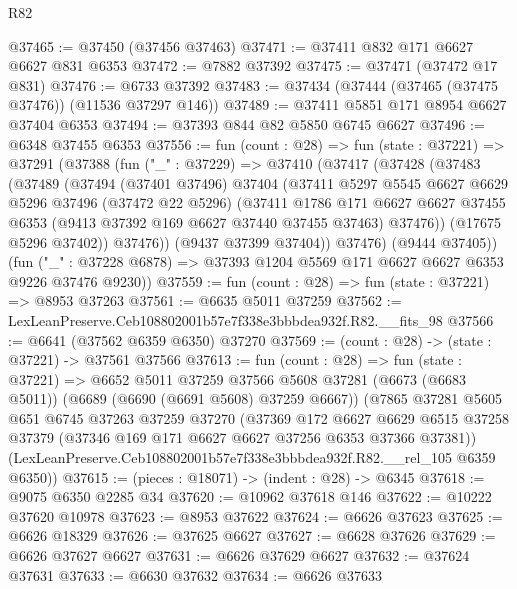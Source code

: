\begin{lexlean}{R82}
\begin{coremodule}
@37465 := @37450 (@37456 @37463)
@37471 := @37411 @832 @171 @6627 @6627 @831 @6353
@37472 := @7882 @37392
@37475 := @37471 (@37472 @17 @831)
@37476 := @6733 @37392
@37483 := @37434 (@37444 (@37465 (@37475 @37476)) (@11536 @37297 @146))
@37489 := @37411 @5851 @171 @8954 @6627 @37404 @6353
@37494 := @37393 @844 @82 @5850 @6745 @6627
@37496 := @6348 @37455 @6353
@37556 := fun (count : @28) =>
  fun (state : @37221) =>
  @37291
    (@37388
      (fun ("_" : @37229) =>
      @37410
        (@37417
          (@37428
            (@37483
              (@37489
                (@37494
                  (@37401 @37496)
                  @37404
                  (@37411
                    @5297
                    @5545
                    @6627
                    @6629
                    @5296
                    @37496
                    (@37472 @22 @5296)
                    (@37411
                      @1786
                      @171
                      @6627
                      @6627
                      @37455
                      @6353
                      (@9413 @37392 @169 @6627 @37440 @37455 @37463)
                      @37476))
                  (@17675 @5296 @37402))
                @37476))
            (@9437 @37399 @37404))
          @37476)
        (@9444 @37405))
      (fun ("_" : @37228 @6878) => @37393 @1204 @5569 @171 @6627 @6627 @6353 @9226 @37476 @9230))
@37559 := fun (count : @28) => fun (state : @37221) => @8953 @37263
@37561 := @6635 @5011 @37259
@37562 := LexLeanPreserve.Ceb108802001b57e7f338e3bbbdea932f.R82.__fits_98
@37566 := @6641 (@37562 @6359 @6350) @37270
@37569 := (count : @28) -> (state : @37221) -> @37561 @37566
@37613 := fun (count : @28) =>
  fun (state : @37221) =>
  @6652
    @5011
    @37259
    @37566
    @5608
    @37281
    (@6673 (@6683 @5011))
    (@6689 (@6690 (@6691 @5608) @37259 @6667))
    (@7865
      @37281
      @5605
      @651
      @6745
      @37263
      @37259
      @37270
      (@37369
        @172
        @6627
        @6629
        @6515
        @37258
        @37379
        (@37346 @169 @171 @6627 @6627 @37256 @6353 @37366 @37381))
      (LexLeanPreserve.Ceb108802001b57e7f338e3bbbdea932f.R82.__rel_105 @6359 @6350))
@37615 := (pieces : @18071) -> (indent : @28) -> @6345
@37618 := @9075 @6350 @2285 @34
@37620 := @10962 @37618 @146
@37622 := @10222 @37620 @10978
@37623 := @8953 @37622
@37624 := @6626 @37623
@37625 := @6626 @18329
@37626 := @37625 @6627
@37627 := @6628 @37626
@37629 := @6626 @37627 @6627
@37631 := @6626 @37629 @6627
@37632 := @37624 @37631
@37633 := @6630 @37632
@37634 := @6626 @37633

\end{coremodule}
\end{lexlean}
